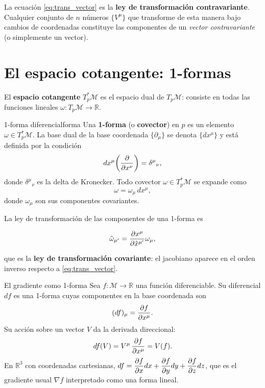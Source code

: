 \begin{importante}
La ecuación \eqref{eq:trans_vector} es la \textbf{ley de transformación contravariante}. Cualquier conjunto de $n$ números $\{V^\mu\}$ que transforme de esta manera bajo cambios de coordenadas constituye las componentes de un \emph{vector contravariante} (o simplemente un vector).
\end{importante}

\section{El espacio cotangente: 1-formas}

El \textbf{espacio cotangente} $T_p^*\mathcal{M}$ es el espacio dual de $T_p\mathcal{M}$: consiste en todas las funciones lineales $\omega: T_p\mathcal{M} \to \mathbb{R}$.

\begin{definicion}{1-forma diferencial}{forma}
Una \textbf{1-forma} (o \textbf{covector}) en $p$ es un elemento $\omega \in T_p^*\mathcal{M}$. La base dual de la base coordenada $\{\partial_\mu\}$ se denota $\{dx^\mu\}$ y está definida por la condición
\[
  dx^\mu\!\left(\dfrac{\partial }{\partial x^\nu}\right) = \delta^\mu{}_\nu,
\]
donde $\delta^\mu{}_\nu$ es la delta de Kronecker. Todo covector $\omega \in T_p^*\mathcal{M}$ se expande como
\[
  \omega = \omega_\mu\, dx^\mu,
\]
donde $\omega_\mu$ son sus componentes covariantes.
\end{definicion}

La ley de transformación de las componentes de una 1-forma es

\begin{equation}
  \tilde{\omega}_{\mu'} = \dfrac{\partial x^\mu}{\partial \tilde{x}^{\mu'}} \omega_\mu,
  \label{eq:trans_covector}
\end{equation}

que es la \textbf{ley de transformación covariante}: el jacobiano aparece en el orden inverso respecto a \eqref{eq:trans_vector}.

\begin{ejemplo}{El gradiente como 1-forma}{}
Sea $f: \mathcal{M} \to \mathbb{R}$ una función diferenciable. Su diferencial $df$ es una 1-forma cuyas componentes en la base coordenada son
\[
  (df)_\mu = \dfrac{\partial f}{\partial x^\mu}.
\]
Su acción sobre un vector $V$ da la derivada direccional:
\[
  df(V) = V^\mu\, \dfrac{\partial f}{\partial x^\mu} = V(f).
\]
En $\mathbb{R}^3$ con coordenadas cartesianas, $df = \dfrac{\partial f}{\partial x}dx + \dfrac{\partial f}{\partial y}dy + \dfrac{\partial f}{\partial z}dz$, que es el gradiente usual $\nabla f$ interpretado como una forma lineal.
\end{ejemplo}

